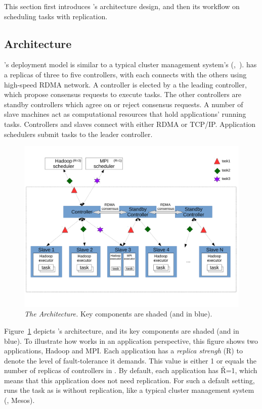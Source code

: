 This section first introduces \xxx's architecture design, and then its workflow 
on scheduling tasks with replication.


\subsection{Architecture} \label{sec:arch}

\xxx's deployment model is similar to a typical cluster management system's 
(\eg,~\cite{borg,mesos}). \xxx has a replicas of three to five controllers, 
with each connects with the others using high-speed RDMA network. A controller 
is elected by \paxos a the leading controller, which propose consensus requests 
to execute tasks. The other controllers are standby controllers which agree on 
or reject consensus requests. A number of slave machines act as computational 
resources that hold applications' running tasks. Controllers and slaves connect 
with either RDMA or TCP/IP. Application schedulers submit tasks to the leader 
controller.

\begin{figure}[t]
\vspace{.20in}
\centering
\includegraphics[width=.47\textwidth]{figures/arch}
\vspace{.06in}
\caption{{\em The \xxx Architecture.} Key components are shaded (and 
in blue).} \label{fig:arch}
\vspace{-.05in}
\end{figure}

Figure~\ref{fig:arch} depicts \xxx's architecture, and its key components are 
shaded (and in blue). To illustrate how \xxx works in an application 
perspective, this figure shows two applications, Hadoop and MPI. Each 
application has a \emph{replica strengh} (R) to denote the level of 
fault-tolerance it demands. This value is either 1 or equals the number of 
replicas of controllers in \xxx. By default, each application has \v{R=1}, 
which means that this application does not need replication. For such a default 
setting, \xxx runs the task as is without replication, like a typical cluster 
management system (\eg, Mesos).

